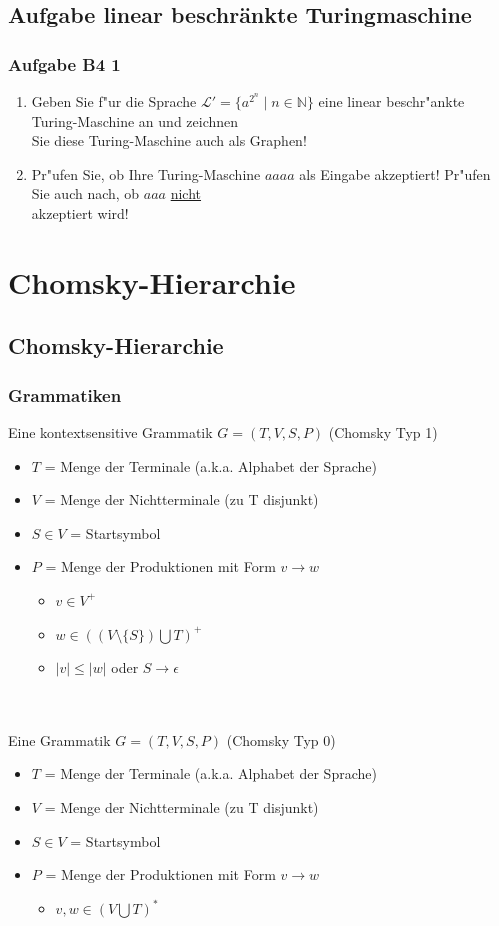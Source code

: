 \subsection{Aufgabe linear beschränkte Turingmaschine}
\begin{frame}
\frametitle{Aufgabe B4 1}
\begin{enumerate}
\item Geben Sie f"ur die Sprache $\mathcal{L}' = \{a^{2^n} \; | \; n \in
\mathbb{N}\}$ eine linear beschr"ankte Turing-Maschine an und zeichnen\\
Sie diese Turing-Maschine auch als Graphen!
\item Pr"ufen Sie, ob Ihre Turing-Maschine $aaaa$ als Eingabe akzeptiert!
Pr"ufen Sie auch nach, ob $aaa$ \underline{nicht}\\
akzeptiert wird!
\end{enumerate}
\end{frame}

\section{Chomsky-Hierarchie}
\subsection{Chomsky-Hierarchie}
\begin{frame}
	\frametitle{Grammatiken}
Eine kontextsensitive Grammatik $G = ( T, V, S, P)$ (Chomsky Typ 1)
\begin{itemize}
	\item $T$ = Menge der Terminale (a.k.a. Alphabet der Sprache)
	\item $V$ = Menge der Nichtterminale (zu T disjunkt)
	\item $S \in V$ = Startsymbol
	\item $P$ = Menge der Produktionen mit Form $v \rightarrow w$
	\begin{itemize}
		\item $v \in V^{+}$
		\item $w \in ((V \setminus \{S\}) \bigcup T)^{+}$
		\item $|v| \leq |w|$ oder $S \rightarrow \epsilon$
	\end{itemize}
\end{itemize}~\\~\\




Eine Grammatik $G = ( T, V, S, P)$ (Chomsky Typ 0)
\begin{itemize}
	\item $T$ = Menge der Terminale (a.k.a. Alphabet der Sprache)
	\item $V$ = Menge der Nichtterminale (zu T disjunkt)
	\item $S \in V$ = Startsymbol
	\item $P$ = Menge der Produktionen mit Form $v \rightarrow w$
	\begin{itemize}
		\item $v,w \in (V \bigcup T)^{*}$
	\end{itemize}
\end{itemize}
\end{frame}

